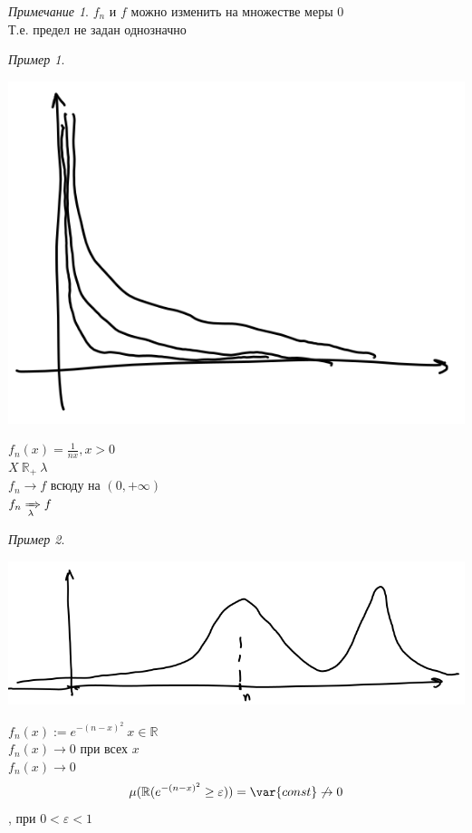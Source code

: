 \documentclass[oneside]{book}
\newcommand{\R}{\mathbb{R}}
\newcommand{\const}{\var{const}}
\theoremstyle{plain}
\theoremstyle{remark}
\newtheorem*{remark}{Примечание}
\newtheorem*{examp}{Пример}
\theoremstyle{definition}
\begin{document}
\begin{remark}
\(f_n\) и \(f\) можно изменить на множестве меры 0 \\
Т.е. предел не задан однозначно
\end{remark}
\begin{examp}
\-
\begin{center}
\includegraphics[scale=0.3]{2_2.png}
\end{center}
\(f_n(x) = \frac{1}{nx}, x > 0\) \\
\(X \ \R_+\ \lambda\) \\
\(f_n \to f\) всюду на \((0, + \infty)\) \\
\(f_n \xRightarrow[\lambda]{} f\)
\end{examp}
\begin{examp}
\-
\begin{center}
\includegraphics[scale=0.3]{2_3.png}
\end{center}
\(f_n(x) := e^{-(n - x)^2}\ x \in \R\) \\
\(f_n(x) \to 0\) при всех \(x\) \\
\(f_n(x) \rightarrow 0\) \\
\[ \mu (\R(e^{-(n - x)^2} \ge \varepsilon)) = \const \not\to 0 \]
, при \(0 < \varepsilon < 1\)
\end{examp}
\end{document}
